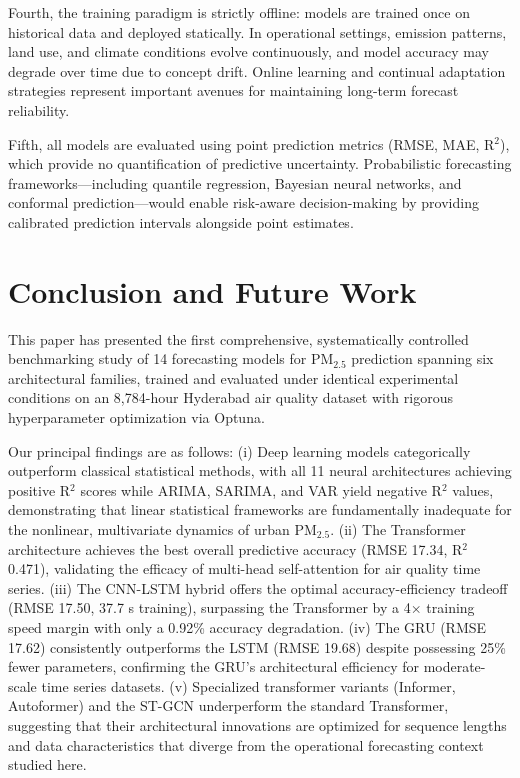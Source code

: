 \documentclass[conference]{IEEEtran}
\begin{document}
Fourth, the training paradigm is strictly offline: models are trained once on historical data and deployed statically. In operational settings, emission patterns, land use, and climate conditions evolve continuously, and model accuracy may degrade over time due to concept drift. Online learning and continual adaptation strategies represent important avenues for maintaining long-term forecast reliability.

Fifth, all models are evaluated using point prediction metrics (RMSE, MAE, R$^{2}$), which provide no quantification of predictive uncertainty. Probabilistic forecasting frameworks---including quantile regression, Bayesian neural networks, and conformal prediction---would enable risk-aware decision-making by providing calibrated prediction intervals alongside point estimates.

\section{Conclusion and Future Work}

This paper has presented the first comprehensive, systematically controlled benchmarking study of 14 forecasting models for PM$_{2.5}$ prediction spanning six architectural families, trained and evaluated under identical experimental conditions on an 8,784-hour Hyderabad air quality dataset with rigorous hyperparameter optimization via Optuna.

Our principal findings are as follows: (i) Deep learning models categorically outperform classical statistical methods, with all 11 neural architectures achieving positive R$^{2}$ scores while ARIMA, SARIMA, and VAR yield negative R$^{2}$ values, demonstrating that linear statistical frameworks are fundamentally inadequate for the nonlinear, multivariate dynamics of urban PM$_{2.5}$. (ii) The Transformer architecture achieves the best overall predictive accuracy (RMSE 17.34, R$^{2}$ 0.471), validating the efficacy of multi-head self-attention for air quality time series. (iii) The CNN-LSTM hybrid offers the optimal accuracy-efficiency tradeoff (RMSE 17.50, 37.7 s training), surpassing the Transformer by a 4$\times$ training speed margin with only a 0.92\% accuracy degradation. (iv) The GRU (RMSE 17.62) consistently outperforms the LSTM (RMSE 19.68) despite possessing 25\% fewer parameters, confirming the GRU's architectural efficiency for moderate-scale time series datasets. (v) Specialized transformer variants (Informer, Autoformer) and the ST-GCN underperform the standard Transformer, suggesting that their architectural innovations are optimized for sequence lengths and data characteristics that diverge from the operational forecasting context studied here.
\end{document}
